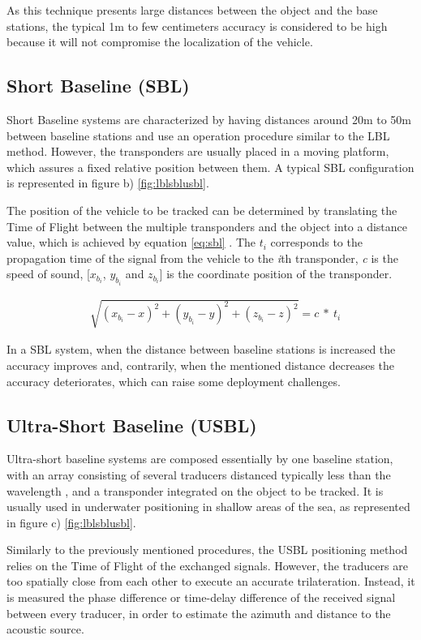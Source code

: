 As this technique presents large distances between the object and the base stations, the typical 1m to few centimeters accuracy is considered to be high because it will not compromise the localization of the vehicle. 


\subsection{Short Baseline (SBL)}

Short Baseline systems are characterized by having distances around 20m to 50m between baseline stations \cite{survey-tech-chall} and use an operation procedure similar to the LBL method. However, the transponders are usually placed in a moving platform, which assures a fixed relative position between them. A typical SBL configuration is represented in figure b) \ref{fig:lblsblusbl}.

The position of the vehicle to be tracked can be determined by translating the Time of Flight between the multiple transponders and the object into a distance value, which is achieved by equation \ref{eq:sbl} \cite{sbl}. The $t_{i}$ corresponds to the propagation time of the signal from the vehicle to the \textit{i}th transponder, \textit{c} is the speed of sound, [$x_{b_{i}}$, $y_{b_{i}}$ and $z_{b_{i}}$] is the coordinate position of the transponder.

\begin{eqnarray}
&\sqrt{ (x_{b_{i}}-x)^2 + (y_{b_{i}}-y)^2 + (z_{b_{i}}-z)^2 } = c\ *\ t_{i}
\label{eq:sbl}
\end{eqnarray}

In a SBL system, when the distance between baseline stations is increased the accuracy improves and, contrarily, when the mentioned distance decreases the accuracy deteriorates, which can raise some deployment challenges.

\subsection{Ultra-Short Baseline (USBL)}

Ultra-short baseline systems are composed essentially by one baseline station, with an array consisting of several traducers distanced typically less than the wavelength \cite{lblsblusbl}, and a transponder integrated on the object to be tracked. It is usually used in underwater positioning in shallow areas of the sea, as represented in figure c) \ref{fig:lblsblusbl}.

Similarly to the previously mentioned procedures, the USBL positioning method relies on the Time of Flight of the exchanged signals. However, the traducers are too spatially close from each other to execute an accurate trilateration. Instead, it is measured the phase difference or time-delay difference of the received signal between every traducer, in order to estimate the azimuth and distance to the acoustic source. 

